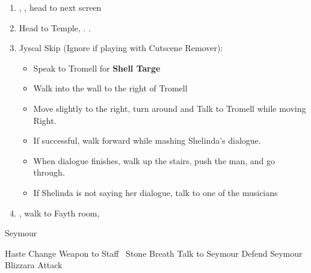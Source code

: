 \begin{enumerate}[resume]
    \item \sd, \cs[0:40], head to next screen
    \item Head to Temple, \sd. \save.
    \wincb
    \item Jyscal Skip (Ignore if playing with Cutscene Remover):
    \begin{itemize}
        \item Speak to Tromell for \textbf{Shell Targe}
        \item Walk into the wall to the right of Tromell
        \item Move slightly to the right, turn around and Talk to Tromell while moving Right.
        \item If successful, walk forward while mashing Shelinda's dialogue.
        \item When dialogue finishes, walk up the stairs, push the man, and go through.
        \item If Shelinda is not saying her dialogue, talk to one of the musicians
    \end{itemize}
    \item \sd, walk to Fayth room, \cs[2:10]
\end{enumerate}
\begin{battle}[3000]{Seymour}
    \begin{itemize}
        \tidusf Haste \tidus
        \yunaf Change Weapon to Staff
        \kimahrif \od\ Stone Breath
        \tidusf Talk to Seymour
        \switch{\yuna}{\auron}
        \auronf Defend
        \enemyf Seymour Blizzara
        \tidusf Attack
    \end{itemize}
\end{battle}
